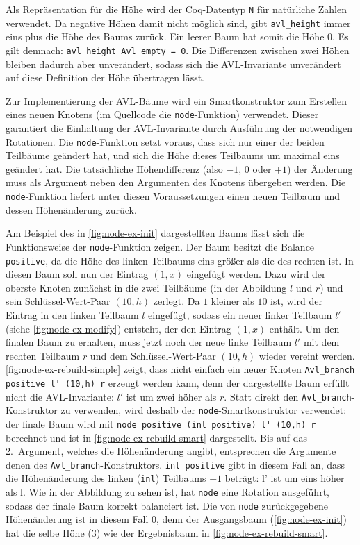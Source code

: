 \documentclass[a4paper, parskip]{scrartcl}
\begin{document}
Als Repräsentation für die Höhe wird der Coq-Datentyp \verb|N| für natürliche Zahlen verwendet.
Da negative Höhen damit nicht möglich sind, gibt \verb|avl_height| immer eins plus die Höhe des Baums zurück.
Ein leerer Baum hat somit die Höhe 0. Es gilt demnach: \verb|avl_height Avl_empty = 0|.
Die Differenzen zwischen zwei Höhen bleiben dadurch aber unverändert, sodass sich die AVL-Invariante unverändert auf diese Definition der Höhe übertragen lässt.

Zur Implementierung der AVL-Bäume wird ein Smartkonstruktor zum Erstellen eines neuen Knotens (im Quellcode die \verb|node|-Funktion) verwendet.\autocite{adams93}
Dieser garantiert die Einhaltung der AVL-Invariante durch Ausführung der notwendigen Rotationen.
Die \verb|node|-Funktion setzt voraus, dass sich nur einer der beiden Teilbäume geändert hat, und sich die Höhe dieses Teilbaums um maximal eins geändert hat.
Die tatsächliche Höhendifferenz (also $-1$, $0$ oder $+1$) der Änderung muss als Argument neben den Argumenten des Knotens übergeben werden.
Die \verb|node|-Funktion liefert unter diesen Voraussetzungen einen neuen Teilbaum und dessen Höhenänderung zurück.

Am Beispiel des in \autoref{fig:node-ex-init} dargestellten Baums lässt sich die Funktionsweise der \verb|node|-Funktion zeigen.
Der Baum besitzt die Balance \verb|positive|, da die Höhe des linken Teilbaums eins größer als die des rechten ist.
In diesen Baum soll nun der Eintrag $(1,x)$ eingefügt werden.
Dazu wird der oberste Knoten zunächst in die zwei Teilbäume (in der Abbildung $l$ und $r$) und sein Schlüssel-Wert-Paar $(10,h)$ zerlegt.
Da $1$ kleiner als $10$ ist, wird der Eintrag in den linken Teilbaum $l$ eingefügt, sodass ein neuer linker Teilbaum $l'$ (siehe \autoref{fig:node-ex-modify}) entsteht, der den Eintrag $(1,x)$ enthält.
Um den finalen Baum zu erhalten, muss jetzt noch der neue linke Teilbaum $l'$ mit dem rechten Teilbaum $r$ und dem Schlüssel-Wert-Paar $(10,h)$ wieder vereint werden.
\autoref{fig:node-ex-rebuild-simple} zeigt, dass nicht einfach ein neuer Knoten \verb|Avl_branch positive l' (10,h) r| erzeugt werden kann, denn der dargestellte Baum erfüllt nicht die AVL-Invariante: $l'$ ist um zwei höher als $r$.
Statt direkt den \verb|Avl_branch|-Konstruktor zu verwenden, wird deshalb der \verb|node|-Smartkonstruktor verwendet: der finale Baum wird mit \verb|node positive (inl positive) l' (10,h) r| berechnet und ist in \autoref{fig:node-ex-rebuild-smart} dargestellt.
Bis auf das 2.~Argument, welches die Höhenänderung angibt, entsprechen die Argumente denen des \verb|Avl_branch|-Konstruktors.
\verb|inl positive| gibt in diesem Fall an, dass die Höhenänderung des linken (\verb|inl|) Teilbaums $+1$ beträgt: l' ist um eins höher als l.
Wie in der Abbildung zu sehen ist, hat \verb|node| eine Rotation ausgeführt, sodass der finale Baum korrekt balanciert ist. 
Die von \verb|node| zurückgegebene Höhenänderung ist in diesem Fall $0$, denn der Ausgangsbaum (\autoref{fig:node-ex-init}) hat die selbe Höhe ($3$) wie der Ergebnisbaum in \autoref{fig:node-ex-rebuild-smart}.
\end{document}

